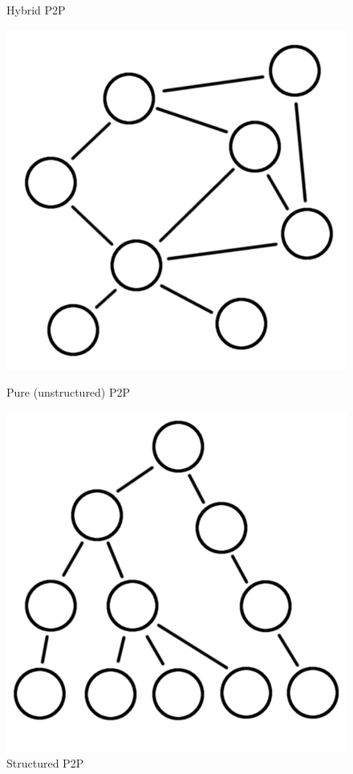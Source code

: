 \begin{figure}
\begin{minipage}{.5\linewidth}
		\caption{Hybrid P2P}
		\label{hybrid_p2p}
	\end{minipage}\par\medskip
	\begin{minipage}{.5\linewidth}
		\centering
		\includegraphics[scale=0.2]{Talk5/pure_p2p.PNG}
		\caption{Pure (unstructured) P2P}
		\label{pure_p2p}
	\end{minipage}%
	\begin{minipage}{.5\linewidth}
		\centering
		\includegraphics[scale=0.2]{Talk5/structured_p2p.PNG}
		\caption{Structured P2P}
		\label{structured_p2p}
	\end{minipage}%
\end{figure}

